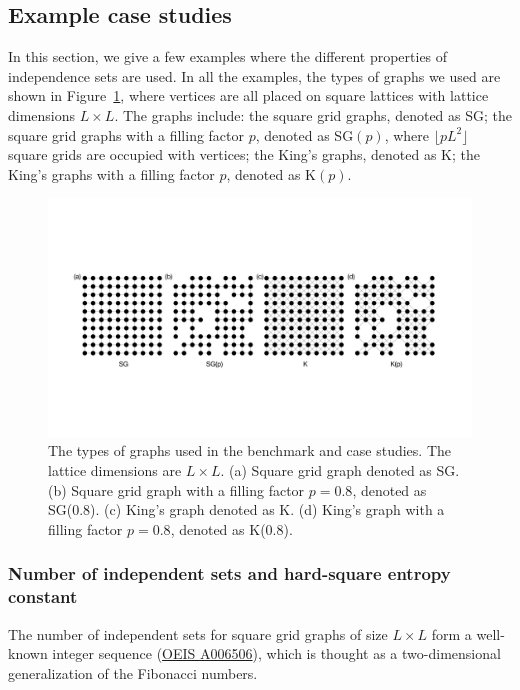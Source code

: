 \documentclass[onefignum, onetabnum]{siamart190516}
\newcommand{\<}{\langle}
\renewcommand{\>}{\rangle}
\newcounter{example}
\begin{document}
\subsection{Example case studies} In this section, we give a few examples where the different properties of independence sets are used.
In all the examples, the types of graphs we used are shown in Figure~\ref{fig:lattices}, where vertices are all placed on square lattices with lattice dimensions $L \times L$.
The graphs include: the square grid graphs, denoted as SG; the square grid graphs with a filling factor $p$, denoted as SG$(p)$, where $\lfloor pL^{2} \rfloor$ square grids are occupied with vertices;
the King's graphs, denoted as K; the King's graphs with a filling factor $p$, denoted as K$(p)$. 

\begin{figure}[t] 
    \centering
    \includegraphics[width=\textwidth, trim={0cm 0cm 0cm 0cm}, clip]{lattices.pdf}
    \caption{The types of graphs used in the benchmark and case studies.
    The lattice dimensions are $L\times L$. (a) Square grid graph denoted as SG. (b) Square grid graph with a filling factor $p=0.8$, denoted as SG(0.8).
    (c) King's graph denoted as K. (d) King's graph with a filling factor $p=0.8$, denoted as K(0.8).}
    \label{fig:lattices}
\end{figure}

\subsubsection{Number of independent sets and hard-square entropy constant}
The number of independent sets for square grid graphs of size $L \times L$ form a well-known integer sequence (\href{https://oeis.org/A006506}{OEIS A006506}), which is thought as a two-dimensional generalization of the Fibonacci numbers.
\end{document}
